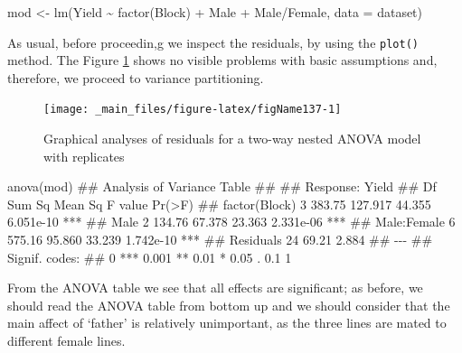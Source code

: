 \documentclass[a4paper,12pt,oneside]{book}
\newenvironment{Shaded}{\begin{snugshade}}{\end{snugshade}}
\newcommand{\SpecialCharTok}[1]{#1}
\newcommand{\DocumentationTok}[1]{#1}
\newcommand{\OtherTok}[1]{#1}
\newcommand{\FunctionTok}[1]{#1}
\newcommand{\AttributeTok}[1]{#1}
\newcommand{\NormalTok}[1]{#1}
\begin{document}
\begin{Shaded}
\begin{Highlighting}[]
\NormalTok{mod }\OtherTok{\textless{}{-}} \FunctionTok{lm}\NormalTok{(Yield }\SpecialCharTok{\textasciitilde{}} \FunctionTok{factor}\NormalTok{(Block) }\SpecialCharTok{+}\NormalTok{ Male }\SpecialCharTok{+}\NormalTok{ Male}\SpecialCharTok{/}\NormalTok{Female, }\AttributeTok{data =}\NormalTok{ dataset)}
\end{Highlighting}
\end{Shaded}

\normalsize

As usual, before proceedin,g we inspect the residuals, by using the \texttt{plot()} method. The Figure \ref{fig:figName137} shows no visible problems with basic assumptions and, therefore, we proceed to variance partitioning.

\begin{figure}

{\centering \texttt{[image: \_main\_files/figure-latex/figName137-1]} 

}

\caption{Graphical analyses of residuals for a two-way nested ANOVA model with replicates}\label{fig:figName137}
\end{figure}

\vspace{12pt}

\begin{Shaded}
\begin{Highlighting}[]
\FunctionTok{anova}\NormalTok{(mod)}
\DocumentationTok{\#\# Analysis of Variance Table}
\DocumentationTok{\#\# }
\DocumentationTok{\#\# Response: Yield}
\DocumentationTok{\#\#               Df Sum Sq Mean Sq F value    Pr(\textgreater{}F)    }
\DocumentationTok{\#\# factor(Block)  3 383.75 127.917  44.355 6.051e{-}10 ***}
\DocumentationTok{\#\# Male           2 134.76  67.378  23.363 2.331e{-}06 ***}
\DocumentationTok{\#\# Male:Female    6 575.16  95.860  33.239 1.742e{-}10 ***}
\DocumentationTok{\#\# Residuals     24  69.21   2.884                      }
\DocumentationTok{\#\# {-}{-}{-}}
\DocumentationTok{\#\# Signif. codes:  }
\DocumentationTok{\#\# 0 \textquotesingle{}***\textquotesingle{} 0.001 \textquotesingle{}**\textquotesingle{} 0.01 \textquotesingle{}*\textquotesingle{} 0.05 \textquotesingle{}.\textquotesingle{} 0.1 \textquotesingle{} \textquotesingle{} 1}
\end{Highlighting}
\end{Shaded}

From the ANOVA table we see that all effects are significant; as before, we should read the ANOVA table from bottom up and we should consider that the main affect of `father' is relatively unimportant, as the three lines are mated to different female lines.
\end{document}
